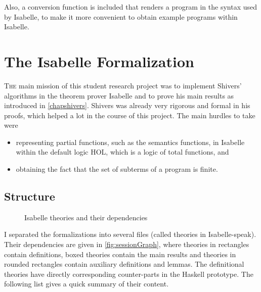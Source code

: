 \documentclass[a4paper,parskip=half,BCOR=8mm,DIV=calc,12pt]{scrbook}
\begin{document}
Also, a conversion function is included that renders a program in the syntax used by Isabelle, to make it more convenient to obtain example programs within Isabelle.

\chapter{The Isabelle Formalization}
\label{chapisabelle}

\lettrine[lines=3]T{he} main mission of this student research project was to implement Shivers’ algorithms in the theorem prover Isabelle\citep{isabelle} and to prove his main results as introduced in \cref{chapshivers}. Shivers was already very rigorous and formal in his proofs, which helped a lot in the course of this project. The main hurdles to take were

\begin{itemize}
\item representing partial functions, such as the semantics functions, in Isabelle within the default logic HOL, which is a logic of total functions, and
\item obtaining the fact that the set of subterms of a program is finite.
\end{itemize}

\section{Structure}

\begin{figure}
\begin{framed}
\centering

\end{framed}
\caption{Isabelle theories and their dependencies}
\label{fig:sessionGraph}
\end{figure}

I separated the formalizations into several files (called theories in Isabelle-speak). Their dependencies are given in \vref{fig:sessionGraph}, where theories in rectangles contain definitions, boxed theories contain the main results and theories in rounded rectangles contain auxiliary definitions and lemmas. The definitional theories have directly corresponding counter-parts in the Haskell prototype. The following list gives a quick summary of their content.
\end{document}
